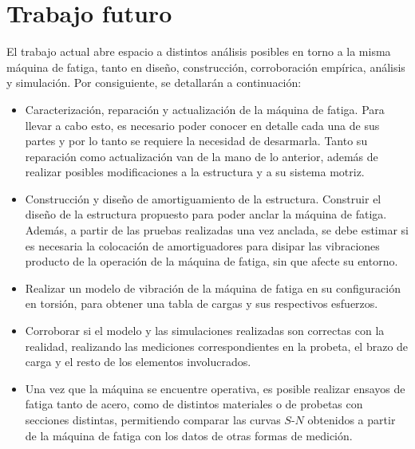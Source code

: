 \section{Trabajo futuro}
El trabajo actual abre espacio a distintos análisis posibles en torno a la misma máquina de fatiga, tanto en diseño, construcción, corroboración empírica, análisis y simulación. Por consiguiente, se detallarán a continuación:
\begin{itemize}
	\item Caracterización, reparación y actualización de la máquina de fatiga. Para llevar a cabo esto, es necesario poder conocer en detalle cada una de sus partes y por lo tanto se requiere la necesidad de desarmarla. Tanto su reparación como actualización van de la mano de lo anterior, además de realizar posibles modificaciones a la estructura y a su sistema motriz.
	\item Construcción y diseño de amortiguamiento de la estructura. Construir el diseño de la estructura propuesto para poder anclar la máquina de fatiga. Además, a partir de las pruebas realizadas una vez anclada, se debe estimar si es necesaria la colocación de amortiguadores para disipar las vibraciones producto de la operación de la máquina de fatiga, sin que afecte su entorno.
	\item Realizar un modelo de vibración de la máquina de fatiga en su configuración en torsión, para obtener una tabla de cargas y sus respectivos esfuerzos.
	\item Corroborar si el modelo y las simulaciones realizadas son correctas con la realidad, realizando las mediciones correspondientes en la probeta, el brazo de carga y el resto de los elementos involucrados.
	\item Una vez que la máquina se encuentre operativa, es posible realizar ensayos de fatiga tanto de acero, como de distintos materiales o de probetas con secciones distintas, permitiendo comparar las curvas $S$-$N$ obtenidos a partir de la máquina de fatiga con los datos de otras formas de medición.
\end{itemize}










